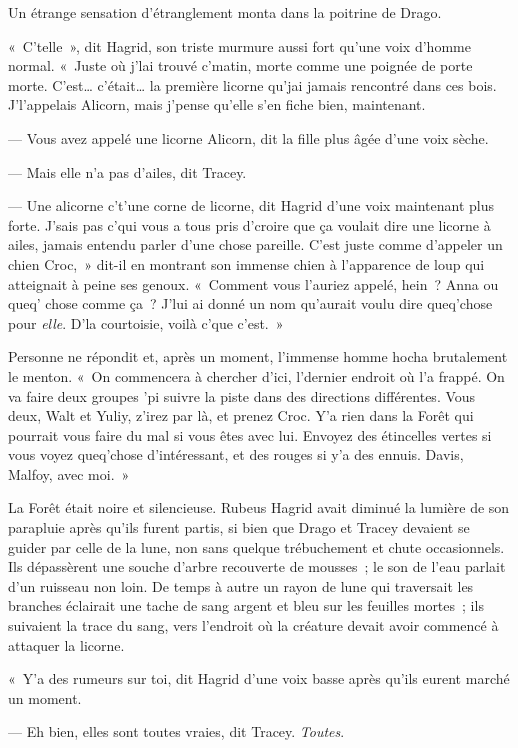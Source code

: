 Un étrange sensation d'étranglement monta dans la poitrine de Drago.

«~C'telle~», dit Hagrid, son triste murmure aussi fort qu'une voix d'homme normal.
«~Juste où j'lai trouvé c'matin, morte comme une poignée de porte morte.
C'est… c'était… la première licorne qu'jai jamais rencontré dans ces bois.
J'l'appelais Alicorn, mais j'pense qu'elle s'en fiche bien, maintenant.

--- Vous avez appelé une licorne Alicorn, dit la fille plus âgée d'une voix sèche.

--- Mais elle n'a pas d'ailes, dit Tracey.

--- Une alicorne c't'une corne de licorne, dit Hagrid d'une voix maintenant plus forte.
J'sais pas c'qui vous a tous pris d'croire que ça voulait dire une licorne à ailes, jamais entendu parler d'une chose pareille.
C'est juste comme d'appeler un chien Croc,~» dit-il en montrant son immense chien à l'apparence de loup qui atteignait à peine ses genoux.
«~Comment vous l'auriez appelé, hein~?
Anna ou queq' chose comme ça~?
J'lui ai donné un nom qu'aurait voulu dire queq'chose pour \emph{elle}.
D'la courtoisie, voilà c'que c'est.~»

Personne ne répondit et, après un moment, l'immense homme hocha brutalement le menton.
«~On commencera à chercher d'ici, l'dernier endroit où l'a frappé.
On va faire deux groupes 'pi suivre la piste dans des directions différentes.
Vous deux, Walt et Yuliy, z'irez par là, et prenez Croc.
Y'a rien dans la Forêt qui pourrait vous faire du mal si vous êtes avec lui.
Envoyez des étincelles vertes si vous voyez queq'chose d'intéressant, et des rouges si y'a des ennuis.
Davis, Malfoy, avec moi.~»

La Forêt était noire et silencieuse.
Rubeus Hagrid avait diminué la lumière de son parapluie après qu'ils furent partis, si bien que Drago et Tracey devaient se guider par celle de la lune, non sans quelque trébuchement et chute occasionnels.
Ils dépassèrent une souche d'arbre recouverte de mousses~; le son de l'eau parlait d'un ruisseau non loin.
De temps à autre un rayon de lune qui traversait les branches éclairait une tache de sang argent et bleu sur les feuilles mortes~; ils suivaient la trace du sang, vers l'endroit où la créature devait avoir commencé à attaquer la licorne.

«~Y'a des rumeurs sur toi, dit Hagrid d'une voix basse après qu'ils eurent marché un moment.

--- Eh bien, elles sont toutes vraies, dit Tracey.
\emph{Toutes}.

